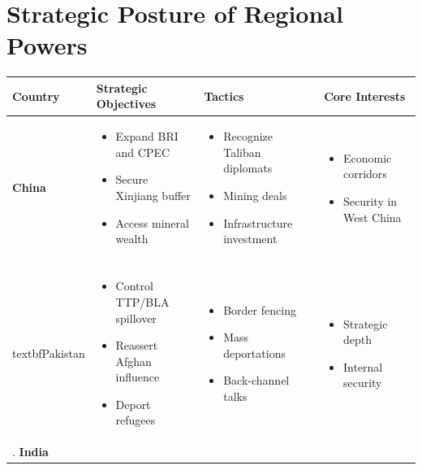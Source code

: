 \documentclass[11pt]{article}
\begin{document}
\section*{Strategic Posture of Regional Powers}
\begin{footnotesize}
\begin{longtable}{|p{2.5cm}|p{4.5cm}|p{4.5cm}|p{4.5cm}|}
\hline
\textbf{Country} & \textbf{Strategic Objectives} & \textbf{Tactics} & \textbf{Core Interests} \\
\hline
\textbf{China} &
\begin{itemize}[leftmargin=*]
\item Expand BRI and CPEC
\item Secure Xinjiang buffer
\item Access mineral wealth
\end{itemize} &
\begin{itemize}[leftmargin=*]
\item Recognize Taliban diplomats
\item Mining deals
\item Infrastructure investment
\end{itemize} &
\begin{itemize}[leftmargin=*]
\item Economic corridors
\item Security in West China
\end{itemize} \\
\hline
\\textbf{Pakistan} &
\begin{itemize}[leftmargin=*]
\item Control TTP/BLA spillover
\item Reassert Afghan influence
\item Deport refugees
\end{itemize} &
\begin{itemize}[leftmargin=*]
\item Border fencing
\item Mass deportations
\item Back-channel talks
\end{itemize} &
\begin{itemize}[leftmargin=*]
\item Strategic depth
\item Internal security
\end{itemize} \\
\hline
.
\textbf{India} &
\begin{itemize}[leftmargin=*]

\end{itemize}
\end{longtable}
\end{footnotesize}
\end{document}
